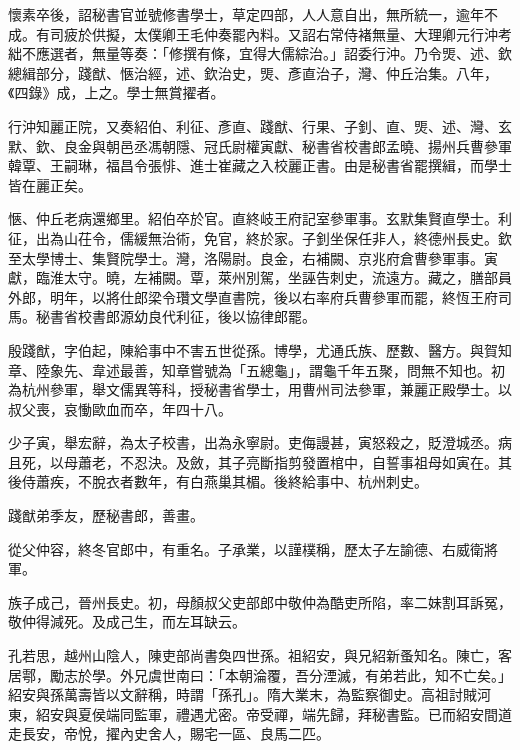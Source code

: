 \begin{pinyinscope}
 懷素卒後，詔秘書官並號修書學士，草定四部，人人意自出，無所統一，逾年不成。有司疲於供擬，太僕卿王毛仲奏罷內料。又詔右常侍褚無量、大理卿元行沖考絀不應選者，無量等奏：「修撰有條，宜得大儒綜治。」詔委行沖。乃令煚、述、欽總緝部分，踐猷、愜治經，述、欽治史，煚、彥直治子，灣、仲丘治集。八年，《四錄》成，上之。學士無賞擢者。



 行沖知麗正院，又奏紹伯、利征、彥直、踐猷、行果、子釗、直、煚、述、灣、玄默、欽、良金與朝邑丞馮朝隱、冠氏尉權寅獻、秘書省校書郎孟曉、揚州兵曹參軍韓覃、王嗣琳，福昌令張悱、進士崔藏之入校麗正書。由是秘書省罷撰緝，而學士皆在麗正矣。



 愜、仲丘老病還鄉里。紹伯卒於官。直終岐王府記室參軍事。玄默集賢直學士。利征，出為山茌令，儒緩無治術，免官，終於家。子釗坐保任非人，終德州長史。欽至太學博士、集賢院學士。灣，洛陽尉。良金，右補闕、京兆府倉曹參軍事。寅獻，臨淮太守。曉，左補闕。覃，萊州別駕，坐誣告刺史，流遠方。藏之，膳部員外郎，明年，以將仕郎梁令瓚文學直書院，後以右率府兵曹參軍而罷，終恆王府司馬。秘書省校書郎源幼良代利征，後以協律郎罷。



 殷踐猷，字伯起，陳給事中不害五世從孫。博學，尤通氏族、歷數、醫方。與賀知章、陸象先、韋述最善，知章嘗號為「五總龜」，謂龜千年五聚，問無不知也。初為杭州參軍，舉文儒異等科，授秘書省學士，用曹州司法參軍，兼麗正殿學士。以叔父喪，哀慟歐血而卒，年四十八。



 少子寅，舉宏辭，為太子校書，出為永寧尉。吏侮謾甚，寅怒殺之，貶澄城丞。病且死，以母蕭老，不忍決。及斂，其子亮斷指剪發置棺中，自誓事祖母如寅在。其後侍蕭疾，不脫衣者數年，有白燕巢其楣。後終給事中、杭州刺史。



 踐猷弟季友，歷秘書郎，善畫。



 從父仲容，終冬官郎中，有重名。子承業，以謹樸稱，歷太子左諭德、右威衛將軍。



 族子成己，晉州長史。初，母顏叔父吏部郎中敬仲為酷吏所陷，率二妹割耳訴冤，敬仲得減死。及成己生，而左耳缺云。



 孔若思，越州山陰人，陳吏部尚書奐四世孫。祖紹安，與兄紹新蚤知名。陳亡，客居鄠，勵志於學。外兄虞世南曰：「本朝淪覆，吾分湮滅，有弟若此，知不亡矣。」紹安與孫萬壽皆以文辭稱，時謂「孫孔」。隋大業末，為監察御史。高祖討賊河東，紹安與夏侯端同監軍，禮遇尤密。帝受禪，端先歸，拜秘書監。已而紹安間道走長安，帝悅，擢內史舍人，賜宅一區、良馬二匹。




\end{pinyinscope}
